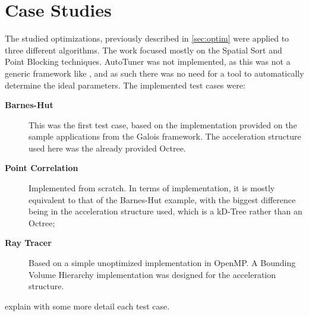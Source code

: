 \section{Case Studies}
\label{sec:cases}

The studied optimizations, previously described in \cref{sec:optim} were applied to three different algorithms. The work focused mostly on the Spatial Sort and Point Blocking techniques. AutoTuner was not implemented, as this was not a generic framework like \treetiler, and as such there was no need for a tool to automatically determine the ideal parameters. The implemented test cases were:

\begin{description}
	\item[\textbf{Barnes-Hut}]
		This was the first test case, based on the implementation provided on the sample applications from the Galois framework. The acceleration structure used here was the already provided Octree.

	\item[\textbf{Point Correlation}]
		Implemented from scratch. In terms of implementation, it is mostly equivalent to that of the Barnes-Hut example, with the biggest difference being in the acceleration structure used, which is a kD-Tree rather than an Octree;

	\item[\textbf{Ray Tracer}]
		Based on a simple unoptimized implementation in OpenMP. A Bounding Volume Hierarchy implementation was designed for the acceleration structure.
\end{description}

 explain with some more detail each test case.



